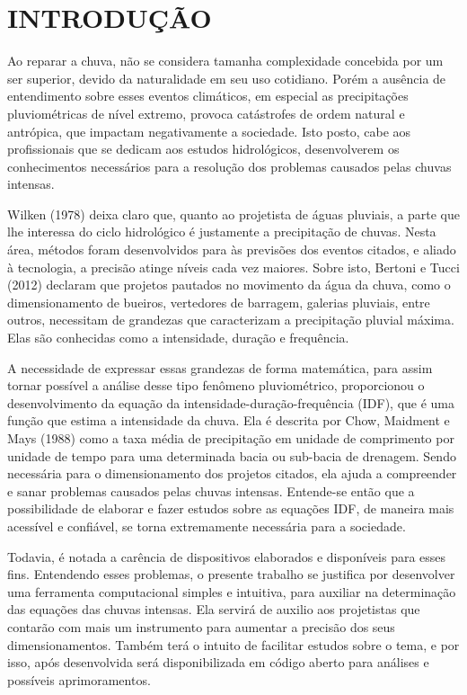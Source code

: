 \onehalfspacing
\chapter{INTRODUÇÃO}

Ao reparar a chuva, não se considera tamanha complexidade concebida por um ser superior, devido da naturalidade em seu uso cotidiano. Porém a ausência de entendimento sobre esses eventos climáticos, em especial as precipitações pluviométricas de nível extremo, provoca catástrofes de ordem natural e antrópica, que impactam negativamente a sociedade. Isto posto, cabe aos profissionais que se dedicam aos estudos hidrológicos, desenvolverem os conhecimentos necessários para a resolução dos problemas causados pelas chuvas intensas.

Wilken (1978) deixa claro que, quanto ao projetista de águas pluviais, a parte que lhe interessa do ciclo hidrológico é justamente a precipitação de chuvas. Nesta área, métodos foram desenvolvidos para às previsões dos eventos citados, e aliado à tecnologia, a precisão atinge níveis cada vez maiores. Sobre isto, Bertoni e Tucci (2012) declaram que projetos pautados no movimento da água da chuva, como o dimensionamento de bueiros, vertedores de barragem, galerias pluviais, entre outros, necessitam de grandezas que caracterizam a precipitação pluvial máxima. Elas são conhecidas como a intensidade, duração e frequência.

A necessidade de expressar essas grandezas de forma matemática, para assim tornar possível a análise desse tipo fenômeno pluviométrico, proporcionou o desenvolvimento da equação da intensidade-duração-frequência (IDF), que é uma função que estima a intensidade da chuva. Ela é descrita por Chow, Maidment e Mays (1988) como a taxa média de precipitação em unidade de comprimento por unidade de tempo para uma determinada bacia ou sub-bacia de drenagem. Sendo necessária para o dimensionamento dos projetos citados, ela ajuda a compreender e sanar problemas causados pelas chuvas intensas. Entende-se então que a possibilidade de elaborar e fazer estudos sobre as equações IDF, de maneira mais acessível e confiável, se torna extremamente necessária para a sociedade. 

Todavia, é notada a carência de dispositivos elaborados e disponíveis para esses fins. Entendendo esses problemas, o presente trabalho se justifica por desenvolver uma ferramenta computacional simples e intuitiva, para auxiliar na determinação das equações das chuvas intensas. Ela servirá de auxilio aos projetistas que contarão com mais um instrumento para aumentar a precisão dos seus dimensionamentos. Também terá o intuito de facilitar estudos sobre o tema, e por isso, após desenvolvida será disponibilizada em código aberto para análises e possíveis aprimoramentos.
 